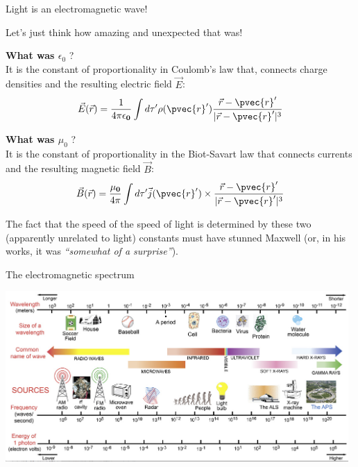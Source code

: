 %
%
%
%

\begin{frame}{Light is an electromagnetic wave!}

Let's just think how amazing and unexpected that was!\\

\vspace{0.1cm}

{\bf What was $\epsilon_0$} ? \\
It is the constant of proportionality in Coulomb's law that, connects
charge densities and the resulting electric field $\vec{E}$:
\begin{equation*}
    \vec{E} (\vec{r})= \frac{1}{4 \pi {\bf \epsilon_0}}
       \int d\tau^{\prime} \rho(\pvec{r}') \frac{\vec{r}-\pvec{r}'}{|\vec{r}-\pvec{r}'|^3}
\end{equation*}

\vspace{0.05cm}

{\bf What was $\mu_0$} ? \\
It is the constant of proportionality in the Biot-Savart law that
connects currents and the resulting magnetic field $\vec{B}$:
\begin{equation*}
   \vec{B} (\vec{r}) = \frac{{\bf \mu_0}}{4\pi}
       \int d\tau^{\prime} \vec{j}(\pvec{r}') \times \frac{\vec{r}-\pvec{r}'}{|\vec{r}-\pvec{r}'|^3}
\end{equation*}

The fact that the speed of the speed of light is determined by these two (apparently
unrelated to light) constants must have stunned Maxwell (or, in his
works, it was {\em ``somewhat of a surprise''}).

\end{frame}


%
%
%
%


\begin{frame}{The electromagnetic spectrum}

\begin{center}
\includegraphics[width=0.98\textwidth]{./images/schematics/emspectrum.png}\\
\end{center}

\end{frame}



